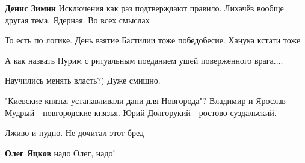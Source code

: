 \begin{itemize}
\begin{itemize}
\textbf{Денис Зимин} Исключения как раз подтверждают правило. Лихачёв вообще другая тема. Ядерная. Во всех смыслах
\end{itemize}

 
То есть по логике. День взятие Бастилии тоже победобесие. Ханука кстати тоже

\begin{itemize}
 
А как назвать Пурим с ритуальным поеданием ушей поверженного врага....
\end{itemize}

 
Научились менять власть?)
Дуже смишно.

 
"Киевские князья устанавливали дани для Новгорода"? Владимир и Ярослав Мудрый - новгородские князья. Юрий Долгорукий - ростово-суздальский.

 
Лживо и нудно.
Не дочитал этот бред

\begin{itemize}
 
\textbf{Олег Яцков} надо Олег, надо!
\end{itemize}


\end{itemize}

